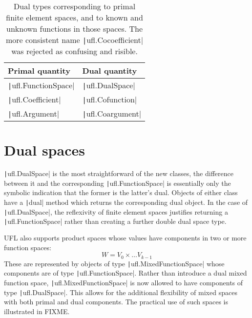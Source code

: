 \documentclass[a4paper,11pt]{article}
\begin{document}
\begin{table}[htbp]
    \centering
    \begin{tabular}{ll}
        Primal quantity & Dual quantity \\\hline
        \texttt|ufl.FunctionSpace| & \texttt|ufl.DualSpace| \\
        \texttt|ufl.Coefficient| & \texttt|ufl.Cofunction| \\
        \texttt|ufl.Argument| & \texttt|ufl.Coargument| \\
    \end{tabular}
    \caption{Dual types corresponding to primal finite element spaces, and to known and unknown functions in those spaces. The more consistent name \texttt|ufl.Cocoefficient| was rejected as confusing and risible.}
    \label{tab:dual_types}
\end{table}

\section{Dual spaces}

\texttt|ufl.DualSpace| is the most straightforward of the new classes, the difference between it and the corresponding \texttt|ufl.FunctionSpace| is essentially only the symbolic indication that the former is the latter's dual. Objects of either class have a \texttt|dual| method which returns the corresponding dual object. In the case of \texttt|ufl.DualSpace|, the reflexivity of finite element spaces justifies returning a \texttt|ufl.FunctionSpace| rather than creating a further double dual space type.

UFL also supports product spaces whose values have components in two or more function spaces:
\begin{equation}
    W = V_0 \times \ldots V_{k-1}     
\end{equation}
These are represented by objects of type \texttt|ufl.MixedFunctionSpace| whose components are of type \texttt|ufl.FunctionSpace|. Rather than introduce a dual mixed function space, \texttt|ufl.MixedFunctionSpace| is now allowed to have components of type \texttt|ufl.DualSpace|. This allows for the additional flexibility of mixed spaces with both primal and dual components. The practical use of such spaces is illustrated in FIXME. 
\end{document}
